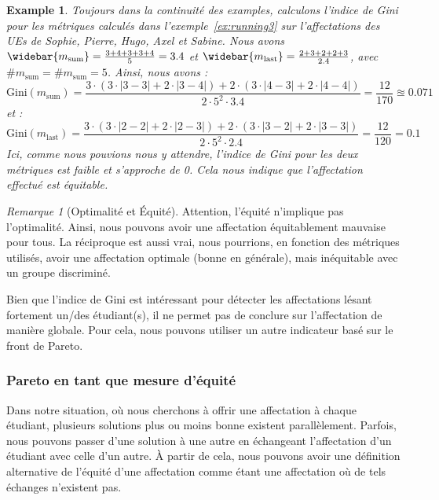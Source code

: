 \documentclass{rapport}
\theoremstyle{definition}
\theoremstyle{remark}
\theoremstyle{plain}
\newtheorem{example}{Example}
\theoremstyle{definition}
\theoremstyle{remark}
\newtheorem{remark}{Remarque}
\begin{document}
\begin{example}\label{ex:running5}
    Toujours dans la continuité des examples, calculons l'indice de Gini pour les métriques calculés dans l'exemple~\ref{ex:running3} sur l'affectations des UEs de Sophie, Pierre, Hugo, Axel et Sabine. 
    Nous avons $\widebar{m_\text{sum}} = \frac{3+4+3+3+4}{5}=3.4$ et $\widebar{m_\text{last}} = \frac{2+3+2+2+3}{2.4}$, avec $\#m_{\text{sum}} = \#m_{\text{sum}} = 5$. 
    Ainsi, nous avons :
    $$
    \text{Gini}(m_{\text{sum}}) = \frac{3\cdot\left(3\cdot|3-3|+2\cdot|3-4|\right)+2\cdot\left(3\cdot|4-3|+2\cdot|4-4|\right)}{2\cdot5^2\cdot3.4} = \frac{12}{170} \approxeq 0.071
    $$
    et :
    $$
    \text{Gini}(m_{\text{last}}) = \frac{3\cdot\left(3\cdot|2-2|+2\cdot|2-3|\right)+2\cdot\left(3\cdot|3-2|+2\cdot|3-3|\right)}{2\cdot5^2\cdot2.4} = \frac{12}{120} = 0.1
    $$
    Ici, comme nous pouvions nous y attendre, l'indice de Gini pour les deux métriques est faible et s'approche de 0. Cela nous indique que l'affectation effectué est équitable.
\end{example}

\begin{remark}[Optimalité et Équité]
    Attention, l'équité n'implique pas l'optimalité. Ainsi, nous pouvons avoir une affectation équitablement mauvaise pour tous. 
    La réciproque est aussi vrai, nous pourrions, en fonction des métriques utilisés, avoir une affectation optimale (bonne en générale), mais inéquitable avec un groupe discriminé.
\end{remark}

Bien que l'indice de Gini est intéressant pour détecter les affectations lésant fortement un/des étudiant(s), il ne permet pas de conclure sur l'affectation de manière globale.
Pour cela, nous pouvons utiliser un autre indicateur basé sur le front de Pareto.

\subsubsection{Pareto en tant que mesure d'équité}
Dans notre situation, où nous cherchons à offrir une affectation à chaque étudiant, plusieurs solutions plus ou moins bonne existent parallèlement. 
Parfois, nous pouvons passer d'une solution à une autre en échangeant l'affectation d'un étudiant avec celle d'un autre.
À partir de cela, nous pouvons avoir une définition alternative de l'équité d'une affectation comme étant une affectation où de tels échanges n'existent pas. 
\end{document}
